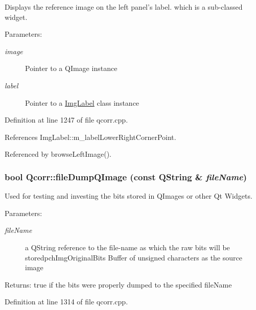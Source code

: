 Displays the reference image on the left panel's label. which is a sub-classed widget. 

\begin{Desc}
\item[Parameters:]
\begin{description}
\item[{\em image}]Pointer to a QImage instance \item[{\em label}]Pointer to a \hyperlink{classImgLabel}{ImgLabel} class instance \end{description}
\end{Desc}


Definition at line 1247 of file qcorr.cpp.

References ImgLabel::m\_\-labelLowerRightCornerPoint.

Referenced by browseLeftImage().\hypertarget{classQcorr_87229fc918fa4011e96fbadb325fd52e}{
\subsubsection[{fileDumpQImage}]{\setlength{\rightskip}{0pt plus 5cm}bool Qcorr::fileDumpQImage (const QString \& {\em fileName})}}
\label{classQcorr_87229fc918fa4011e96fbadb325fd52e}


Used for testing and investing the bits stored in QImages or other Qt Widgets. 

\begin{Desc}
\item[Parameters:]
\begin{description}
\item[{\em fileName}]a QString reference to the file-name as which the raw bits will be storedpchImgOriginalBits Buffer of unsigned characters as the source image \end{description}
\end{Desc}
\begin{Desc}
\item[Returns:]true if the bits were properly dumped to the specified fileName \end{Desc}


Definition at line 1314 of file qcorr.cpp.

